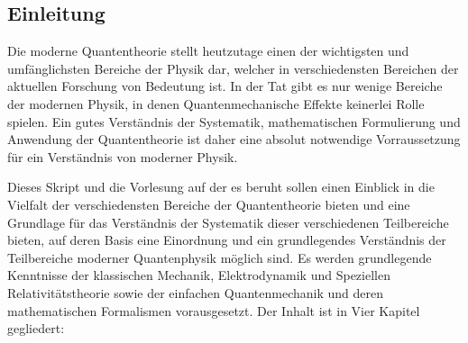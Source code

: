 %
%
%

\subsection*{Einleitung} \vspace{-.5cm}
Die moderne Quantentheorie stellt heutzutage einen der wichtigsten und umfänglichsten Bereiche der Physik dar, welcher in verschiedensten Bereichen der aktuellen Forschung von Bedeutung ist. In der Tat gibt es nur wenige Bereiche der modernen Physik, in denen Quantenmechanische Effekte keinerlei Rolle spielen. Ein gutes Verständnis der Systematik, mathematischen Formulierung und Anwendung der Quantentheorie ist daher eine absolut notwendige Vorraussetzung für ein Verständnis von moderner Physik. 

Dieses Skript und die Vorlesung auf der es beruht sollen einen Einblick in die Vielfalt der verschiedensten Bereiche der Quantentheorie bieten und eine Grundlage für das Verständnis der Systematik dieser verschiedenen Teilbereiche bieten, auf deren Basis eine Einordnung und ein grundlegendes Verständnis der Teilbereiche moderner Quantenphysik möglich sind. Es werden grundlegende Kenntnisse der klassischen Mechanik, Elektrodynamik und Speziellen Relativitätstheorie sowie der einfachen Quantenmechanik und deren mathematischen Formalismen vorausgesetzt. Der Inhalt ist in Vier Kapitel gegliedert:

